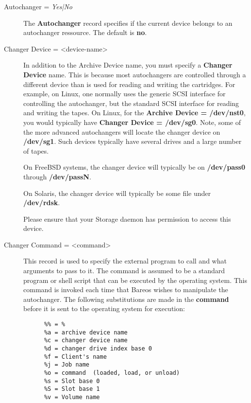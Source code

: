 \begin{description}

\item [Autochanger = {\it Yes|No} ]
   The {\bf Autochanger} record specifies if the current device belongs to an
autochanger ressource. The default is {\bf no}.

\item [Changer Device = {\textless}device-name{\textgreater}]
   In addition to the Archive Device name, you must specify a  {\bf Changer
Device} name. This is because most autochangers are  controlled through a
different device than is used for reading and  writing the cartridges. For
example, on Linux, one normally uses the generic SCSI interface for
controlling the autochanger, but the standard SCSI interface for reading and
writing the  tapes. On Linux, for the {\bf Archive Device = /dev/nst0},  you
would typically have {\bf Changer Device = /dev/sg0}.  Note, some of the more
advanced autochangers will locate the changer device on {\bf /dev/sg1}. Such
devices typically have  several drives and a large number of tapes.

On FreeBSD systems, the changer device will typically be on {\bf /dev/pass0}
through {\bf /dev/passN}.

On Solaris, the changer device will typically be some file under {\bf
/dev/rdsk}.

Please ensure that your Storage daemon has permission to access this
device.

\item [Changer Command = {\textless}command{\textgreater}]
   This record is used to specify the external program to call  and what
arguments to pass to it. The command is assumed to be  a standard program or
shell script that can be executed by  the operating system. This command is
invoked each time that Bareos wishes to manipulate the autochanger.  The
following substitutions are made in the {\bf command}  before it is sent to
the operating system for execution:

\footnotesize
\begin{verbatim}
      %% = %
      %a = archive device name
      %c = changer device name
      %d = changer drive index base 0
      %f = Client's name
      %j = Job name
      %o = command  (loaded, load, or unload)
      %s = Slot base 0
      %S = Slot base 1
      %v = Volume name
\end{verbatim}
\normalsize


\end{description}
